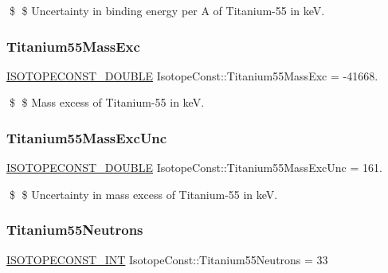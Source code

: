 \$ \$ Uncertainty in binding energy per A of Titanium-\/55 in keV. \mbox{\label{group___isotope_const-_titanium-_ti55_ga7be52518eda6329a20655f492c96638a}} 
\subsubsection{\texorpdfstring{Titanium55\+Mass\+Exc}{Titanium55MassExc}}
{\footnotesize\ttfamily \mbox{\hyperlink{group___isotope_const-_macros_ga8f45a7272ce02c0b4c65c44636ed719a}{I\+S\+O\+T\+O\+P\+E\+C\+O\+N\+S\+T\+\_\+\+D\+O\+U\+B\+LE}} Isotope\+Const\+::\+Titanium55\+Mass\+Exc = -\/41668.}

\$ \$ Mass excess of Titanium-\/55 in keV. \mbox{\label{group___isotope_const-_titanium-_ti55_ga9aa55fcdfc60de2b00d4d95f6f576c98}} 
\subsubsection{\texorpdfstring{Titanium55\+Mass\+Exc\+Unc}{Titanium55MassExcUnc}}
{\footnotesize\ttfamily \mbox{\hyperlink{group___isotope_const-_macros_ga8f45a7272ce02c0b4c65c44636ed719a}{I\+S\+O\+T\+O\+P\+E\+C\+O\+N\+S\+T\+\_\+\+D\+O\+U\+B\+LE}} Isotope\+Const\+::\+Titanium55\+Mass\+Exc\+Unc = 161.}

\$ \$ Uncertainty in mass excess of Titanium-\/55 in keV. \mbox{\label{group___isotope_const-_titanium-_ti55_gaf07c369633d3ae562eddf21e7b6f1bd7}} 
\subsubsection{\texorpdfstring{Titanium55\+Neutrons}{Titanium55Neutrons}}
{\footnotesize\ttfamily \mbox{\hyperlink{group___isotope_const-_macros_ga5f18360b3e99483a35c32d789e62621c}{I\+S\+O\+T\+O\+P\+E\+C\+O\+N\+S\+T\+\_\+\+I\+NT}} Isotope\+Const\+::\+Titanium55\+Neutrons = 33}

